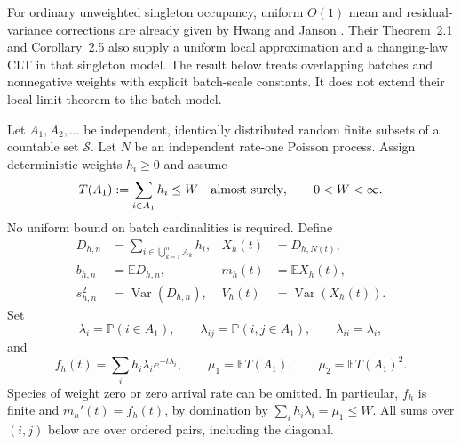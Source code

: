 \documentclass[11pt]{article}
\numberwithin{equation}{section}
\theoremstyle{remark}
\newcommand{\E}{\mathbb E}
\newcommand{\Pp}{\mathbb P}
\newcommand{\Var}{\operatorname{Var}}
\begin{document}
For ordinary unweighted singleton occupancy, uniform $O(1)$ mean and
residual-variance corrections are already given by
Hwang and Janson \cite[Theorem~2.3]{HJ}. Their Theorem~2.1 and
Corollary~2.5 also supply a uniform local approximation and a changing-law
CLT in that singleton model. The result below treats overlapping batches
and nonnegative weights with explicit batch-scale constants. It does not
extend their local limit theorem to the batch model.

Let $A_1,A_2,\ldots$ be independent, identically distributed random finite
subsets of a countable set $\mathcal S$. Let $N$ be an independent rate-one
Poisson process. Assign deterministic weights $h_i\ge0$ and assume
\[
 T(A_1):=\sum_{i\in A_1}h_i\le W\quad\hbox{almost surely},
 \qquad 0<W<\infty.
\]
No uniform bound on batch cardinalities is required. Define
\begin{align*}
 D_{h,n}&=\sum_{i\in\bigcup_{k=1}^n A_k}h_i,
 &X_h(t)&=D_{h,N(t)},\\
 b_{h,n}&=\E D_{h,n},
 &m_h(t)&=\E X_h(t),\\
 s_{h,n}^2&=\Var(D_{h,n}),
 &V_h(t)&=\Var(X_h(t)).
\end{align*}
Set
\[
 \lambda_i=\Pp(i\in A_1),\qquad
 \lambda_{ij}=\Pp(i,j\in A_1),\qquad \lambda_{ii}=\lambda_i,
\]
and
\[
 f_h(t)=\sum_i h_i\lambda_i e^{-t\lambda_i},\qquad
 \mu_1=\E T(A_1),\qquad \mu_2=\E T(A_1)^2.
\]
Species of weight zero or zero arrival rate can be omitted. In particular,
$f_h$ is finite and $m_h'(t)=f_h(t)$, by domination by
$\sum_i h_i\lambda_i=\mu_1\le W$.
All sums over $(i,j)$ below are over ordered pairs, including the diagonal.
\end{document}
